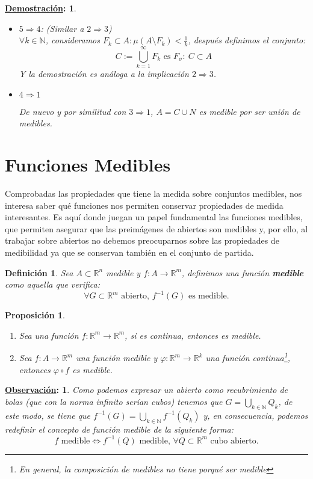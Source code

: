 \documentclass[10pt,a4paper,openright]{book}
\theoremstyle{break}
\newtheorem*{defi}{Definición}
\newtheorem*{prop}{Proposición}
\newtheorem*{demo}{\underline{Demostración}:}
\newtheorem*{obs}{\underline{Observación}:}
\begin{document}
\begin{demo}
\begin{itemize}
\item $5 \Rightarrow 4$: (Similar a $2 \Rightarrow 3$)\\
$\forall k \in \mathbb{N}$, consideramos $F_k \subset A : \mu\left( A \setminus F_k \right) < \frac{1}{k}$, después definimos el conjunto:
$$C := \bigcup_{k = 1}^{\infty}F_k  \text{ es } F_{\sigma} : \ C \subset A$$ 
Y la demostración es análoga a la implicación $2 \Rightarrow 3$.

\item $4 \Rightarrow 1$

De nuevo y por similitud con $3\Rightarrow 1$, $A = C \cup N$ es medible por ser unión de medibles.
\end{itemize}
\end{demo}

\section{Funciones Medibles}
Comprobadas las propiedades que tiene la medida sobre conjuntos medibles, nos interesa saber qué funciones nos permiten conservar propiedades de medida interesantes. Es aquí donde juegan un papel fundamental las funciones medibles, que permiten asegurar que las preimágenes de abiertos son medibles y, por ello, al trabajar sobre abiertos no debemos preocuparnos sobre las propiedades de medibilidad ya que se conservan también en el conjunto de partida.
 
\begin{defi}
Sea $A \subset \mathbb{R}^n$ medible y $f: A \rightarrow \mathbb{R}^m$, definimos una función \textbf{medible} como aquella que verifica:
$$\forall G \subset \mathbb{R}^m \text{ abierto, } f^{-1}(G) \text{ es medible}.$$ 
\end{defi}

\begin{prop}
\begin{enumerate}
\item Sea una función $f: \mathbb{R}^m \rightarrow \mathbb{R}^m$, si es continua, entonces es medible.

\item Sea $f: A \rightarrow \mathbb{R}^m$ una función medible y $\varphi: \mathbb{R}^m \rightarrow \mathbb{R}^k$ una función continua\footnote{En general, la composición de medibles no tiene porqué ser medible}, entonces $\varphi \circ f$ es medible.
\end{enumerate}
\end{prop}

\begin{obs}
Como podemos expresar un abierto como recubrimiento de bolas (que con la norma infinito serían cubos) tenemos que $G = \bigcup_{k \in \mathbb{N}} Q_k$, de este modo, se tiene que $f^{-1}\left( G \right) = \bigcup_{k \in \mathbb{N}}f^{-1}\left( Q_k \right)$ y, en consecuencia, podemos redefinir el concepto de función medible de la siguiente forma:
$$f \text{ medible} \Leftrightarrow f^{-1}\left( Q \right) \text{ medible, } \forall Q \subset \mathbb{R}^m \text{ cubo abierto.}$$
\end{obs}
\end{document}
